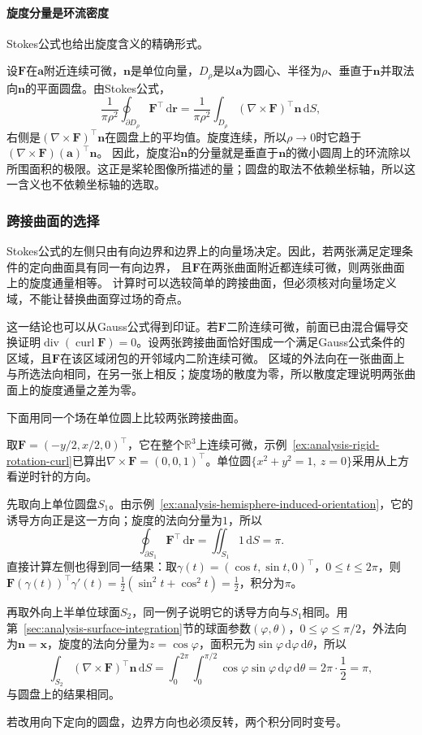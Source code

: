 \paragraph{旋度分量是环流密度}

Stokes公式也给出旋度含义的精确形式。

设$\bm F$在$\bm a$附近连续可微，$\bm n$是单位向量，$D_\rho$是以$\bm a$为圆心、半径为$\rho$、垂直于$\bm n$并取法向$\bm n$的平面圆盘。由Stokes公式，
\[
 \frac1{\pi\rho^2}\oint_{\partial D_\rho}\bm F^\top\,\mathrm d\bm r
 =\frac1{\pi\rho^2}\int_{D_\rho}(\nabla\times\bm F)^\top\bm n\,\mathrm dS,
\]
右侧是$(\nabla\times\bm F)^\top\bm n$在圆盘上的平均值。旋度连续，所以$\rho\to0$时它趋于$(\nabla\times\bm F)(\bm a)^\top\bm n$。
因此，旋度沿$\bm n$的分量就是垂直于$\bm n$的微小圆周上的环流除以所围面积的极限。这正是桨轮图像所描述的量；圆盘的取法不依赖坐标轴，所以这一含义也不依赖坐标轴的选取。

\subsubsection{跨接曲面的选择}

Stokes公式的左侧只由有向边界和边界上的向量场决定。因此，若两张满足定理条件的定向曲面具有同一有向边界，
且$\bm F$在两张曲面附近都连续可微，则两张曲面上的旋度通量相等。
计算时可以选较简单的跨接曲面，但必须核对向量场定义域，不能让替换曲面穿过场的奇点。

这一结论也可以从Gauss公式得到印证。若$\bm F$二阶连续可微，前面已由混合偏导交换证明$\operatorname{div}(\operatorname{curl}\bm F)=0$。设两张跨接曲面恰好围成一个满足Gauss公式条件的区域，且$\bm F$在该区域闭包的开邻域内二阶连续可微。
区域的外法向在一张曲面上与所选法向相同，在另一张上相反；旋度场的散度为零，所以散度定理说明两张曲面上的旋度通量之差为零。

下面用同一个场在单位圆上比较两张跨接曲面。
\begin{example}[单位圆上的圆盘与半球面]
取$\bm F=(-y/2,x/2,0)^\top$，它在整个$\mathbb R^3$上连续可微，示例~\ref{ex:analysis-rigid-rotation-curl}已算出$\nabla\times\bm F=(0,0,1)^\top$。单位圆$\{x^2+y^2=1,\ z=0\}$采用从上方看逆时针的方向。

先取向上单位圆盘$S_1$。由示例~\ref{ex:analysis-hemisphere-induced-orientation}，它的诱导方向正是这一方向；旋度的法向分量为$1$，所以
\[
 \oint_{\partial S_1}\bm F^\top\,\mathrm d\bm r
 =\iint_{S_1}1\,\mathrm dS=\pi.
\]
直接计算左侧也得到同一结果：取$\gamma(t)=(\cos t,\sin t,0)^\top$，$0\leq t\leq2\pi$，则$\bm F(\gamma(t))^\top\gamma'(t)=\tfrac12(\sin^2t+\cos^2t)=\tfrac12$，积分为$\pi$。

再取外向上半单位球面$S_2$，同一例子说明它的诱导方向与$S_1$相同。用第~\ref{sec:analysis-surface-integration}节的球面参数$(\varphi,\theta)$，$0\leq\varphi\leq\pi/2$，外法向为$\bm n=\bm x$，旋度的法向分量为$z=\cos\varphi$，面积元为$\sin\varphi\,\mathrm d\varphi\,\mathrm d\theta$，所以
\[
 \int_{S_2}(\nabla\times\bm F)^\top\bm n\,\mathrm dS
 =\int_0^{2\pi}\int_0^{\pi/2}\cos\varphi\sin\varphi\,\mathrm d\varphi\,\mathrm d\theta
 =2\pi\cdot\frac12=\pi,
\]
与圆盘上的结果相同。
\end{example}
若改用向下定向的圆盘，边界方向也必须反转，两个积分同时变号。


